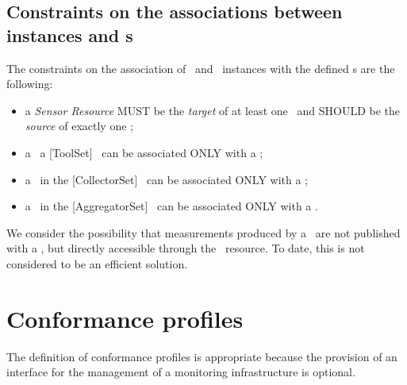 \documentclass[12pt]{article}  %
\begin{document}
\subsection{Constraints on the associations between instances and \mi s}

The constraints on the association of \sens\ and \coll\ instances with the defined \mi s are the following:

\begin{itemize}

\item a {\em Sensor Resource} MUST be the {\em target} of at least one \coll\ and SHOULD be the {\em source} of exactly one \coll;

\item a \mi\ a [{ToolSet}] \mi\ can be associated ONLY with a \coll;

\item a \mi\ in the [{CollectorSet}] \mi\ can be associated ONLY with a \coll;

\item a \mi\ in the [{AggregatorSet}] \mi\ can be associated ONLY with a \sens.

\end{itemize}

We consider the possibility that measurements produced by a \sens\ are not published with a \coll , but directly accessible through the \sens\ resource. To date, this is not considered to be an efficient solution.


\section{Conformance profiles}

The definition of conformance profiles is appropriate because the provision of an interface for the management of a monitoring infrastructure is optional. 
\end{document}

